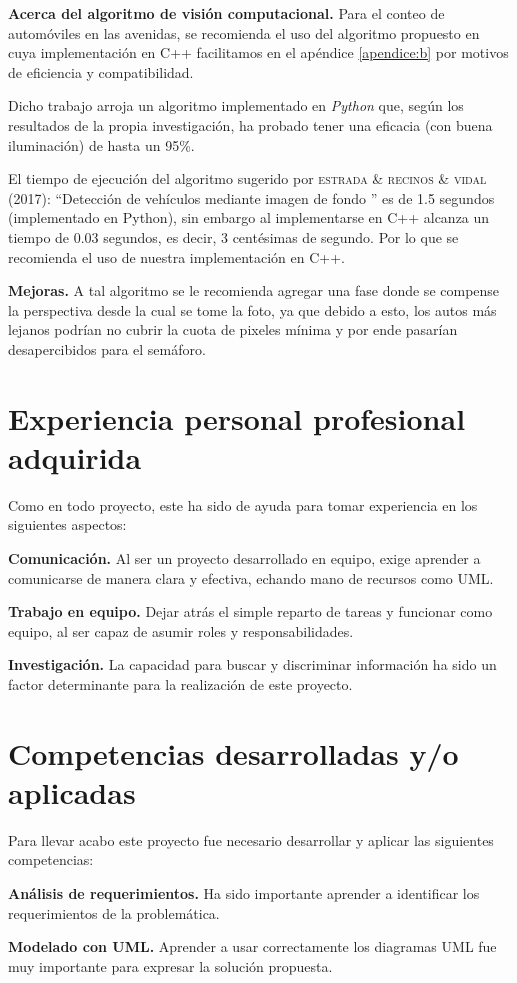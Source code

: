 \textbf{Acerca del algoritmo de visión computacional.}
Para el conteo de automóviles en las avenidas, se recomienda el uso del algoritmo propuesto en \cite{ittap} cuya implementación en C++ facilitamos en el apéndice \ref{apendice:b}  por motivos de eficiencia y compatibilidad. 

Dicho trabajo arroja un algoritmo implementado en \emph{Python} que, según los resultados de la propia investigación, ha probado tener una eficacia (con buena iluminación) de hasta un 95\%.

El tiempo de ejecución del algoritmo sugerido por \textsc{estrada \& recinos \& vidal (2017)}: ``Detección de vehículos mediante imagen de fondo '' es de 1.5 segundos (implementado en Python), sin embargo al implementarse en C++ alcanza un tiempo de 0.03 segundos, es decir, 3 centésimas de segundo. Por lo que se recomienda el uso de nuestra implementación en C++.

\textbf{Mejoras.}
A tal algoritmo se le recomienda agregar una fase donde se compense la perspectiva desde la cual se tome la foto, ya que debido a esto, los autos más lejanos podrían no cubrir la cuota de pixeles mínima y por ende pasarían desapercibidos para el semáforo.

\section{Experiencia personal profesional adquirida}

Como en todo proyecto, este ha sido de ayuda para tomar experiencia en los siguientes aspectos:

\textbf{Comunicación.} Al ser un proyecto desarrollado en equipo, exige aprender a comunicarse de manera clara y efectiva, echando mano de recursos como UML.

\textbf{Trabajo en equipo.} Dejar atrás el simple reparto de tareas y funcionar como equipo, al ser capaz de asumir roles y responsabilidades.

\textbf{Investigación.} La capacidad para buscar y discriminar información ha sido un factor determinante para la realización de este proyecto.


\section{Competencias desarrolladas y/o aplicadas}

Para llevar acabo este proyecto fue necesario desarrollar y aplicar las siguientes competencias:

\textbf{Análisis de requerimientos.} Ha sido importante aprender a identificar los requerimientos de la problemática.

\textbf{Modelado con UML.} Aprender a usar correctamente los diagramas UML fue muy importante para expresar la solución propuesta.

